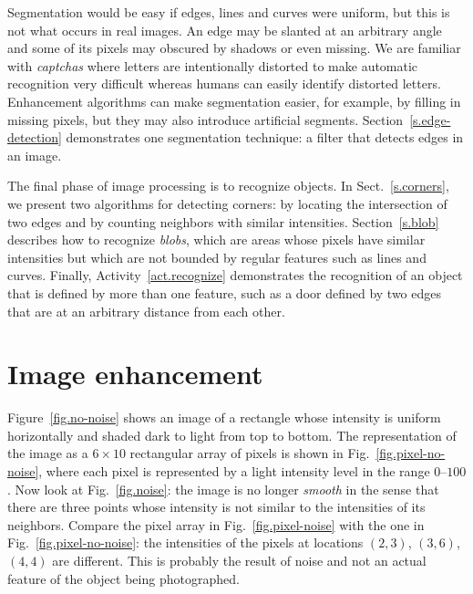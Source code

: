 Segmentation would be easy if edges, lines and curves were uniform, but this is not what occurs in real images. An edge may be slanted at an arbitrary angle and some of its pixels may obscured by shadows or even missing. We are familiar with \emph{captchas} where letters are intentionally distorted to make automatic recognition very difficult whereas humans can easily identify distorted letters. Enhancement algorithms can make segmentation easier, for example, by filling in missing pixels, but they may also introduce artificial segments. Section~\ref{s.edge-detection} demonstrates one segmentation technique: a filter that detects edges in an image.

The final phase of image processing is to recognize objects. In Sect.~\ref{s.corners}, we present two algorithms for detecting corners: by locating the intersection of two edges and by counting neighbors with similar intensities. Section~\ref{s.blob} describes how to recognize \emph{blobs}, which are areas whose pixels have similar intensities but which are not bounded by regular features such as lines and curves. Finally, Activity~\ref{act.recognize} demonstrates the recognition of an object that is defined by more than one feature, such as a door defined by two edges that are at an arbitrary distance from each other.

\section{Image enhancement}\label{s.enhance}

Figure~\ref{fig.no-noise} shows an image of a rectangle whose intensity is uniform horizontally and shaded dark to light from top to bottom. The representation of the image as a $6\times 10$ rectangular array of pixels is shown in Fig.~\ref{fig.pixel-no-noise}, where each pixel is represented by a light intensity level in the range $0$--$100$. Now look at Fig.~\ref{fig.noise}: the image is no longer \emph{smooth} in the sense that there are three points whose intensity is not similar to the intensities of its neighbors. Compare the pixel array in Fig.~\ref{fig.pixel-noise} with the one in Fig.~\ref{fig.pixel-no-noise}: the intensities of the pixels at locations $(2,3)$, $(3,6)$, $(4,4)$ are different. This is probably the result of noise and not an actual feature of the object being photographed. 

